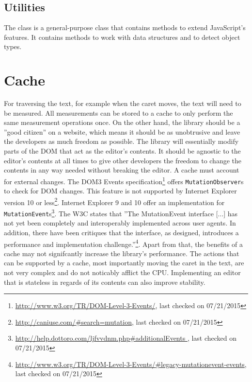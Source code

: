 \subsection{Utilities}
\label{sec:utilities_class}
The  class is a general-purpose class that contains methods to extend JavaScript's features. It contains methods to work with data structures and to detect object types.

\section{Cache}
\label{sec:cache}

For traversing the text, for example when the caret moves, the text will need to be measured. All measurements can be stored to a cache to only perform the same measurement operations once. On the other hand, the library should be a ''good citizen'' on a website, which means it should be as unobtrusive and leave the developers as much freedom as possible. The library will essentially modify parts of the DOM that act as the editor's contents. It should be agnostic to the editor's contents at all times to give other developers the freedom to change the contents in any way needed without breaking the editor. A cache must account for external changes. The DOM3 Events specification\footnote{\url{http://www.w3.org/TR/DOM-Level-3-Events/}, last checked on 07/21/2015} offers \texttt{MutationObserver}s to check for DOM changes. This feature is not supported by Internet Explorer version 10 or less\footnote{\url{http://caniuse.com/\#search=mutation}, last checked on 07/21/2015}. Internet Explorer 9 and 10 offer an implementation for \texttt{MutationEvent}s\footnote{\url{http://help.dottoro.com/ljfvvdnm.php\#additionalEvents }, last checked on 07/21/2015}. The W3C states that ''The MutationEvent interface [...] has not yet been completely and interoperably implemented across user agents. In addition, there have been critiques that the interface, as designed, introduces a performance and implementation challenge.''\footnote{\url{http://www.w3.org/TR/DOM-Level-3-Events/\#legacy-mutationevent-events}, last checked on 07/21/2015}. Apart from that, the benefits of a cache may not signifcantly increase the library's performance. The actions that can be supported by a cache, most importantly moving the caret in the text, are not very complex and do not noticably afflict the CPU. Implementing an editor that is stateless in regards of its contents can also improve stability.


